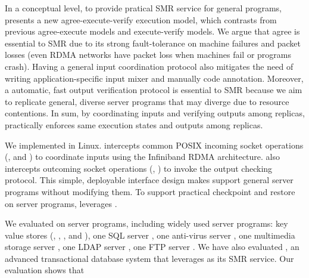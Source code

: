 In a conceptual level, to provide pratical SMR service for general programs, 
\xxx presents a new agree-execute-verify execution model, which contrasts from 
previous agree-execute models and execute-verify models. We argue that agree is 
essential to SMR due to its strong fault-tolerance on machine failures and 
packet losses (even RDMA networks have packet loss when machines fail or 
programs crash). Having a general input coordination protocol also mitigates 
the need of writing application-specific input mixer and manually code 
annotation. Moreover, a automatic, fast output verification protocol is 
essential to SMR because we aim to replicate general, diverse server programs 
that may diverge due to resource contentions. In sum, by coordinating inputs 
and verifying outputs among replicas, \xxx practically enforces same execution 
states and outputs among replicas.

We implemented \xxx in Linux. \xxx intercepts common POSIX incoming socket 
operations (\eg, \accept and \recv) to coordinate inputs using the Infiniband 
RDMA architecture. \xxx also intercepts outcoming socket operations (\eg, 
\send) to invoke the output checking protocol. This simple, deployable 
interface design makes \xxx support general server programs without modifying 
them. To support practical checkpoint and restore on server 
programs, \xxx leverages \criu.

We evaluated \xxx on \nprog server programs, including \npopularprog 
widely used server programs: \nkvprog key value stores (\redis, 
\memcached, \ssdb, and \mongodb), one SQL server \mysql, one anti-virus server 
\clamav, one multimedia storage server \mediatomb, one LDAP server \openldap, 
one FTP server \tftp. We have also evaluated \calvin, an advanced transactional 
database system that leverages \zookeeper as its SMR service. Our evaluation 
shows that

